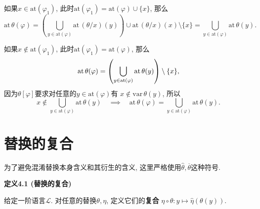 \begin{enumerate}
    \hspace{2.17em}
    如果$x\in\mathrm{at}(\varphi_1)$,
    此时$\mathrm{at}(\varphi_1)=\mathrm{at}(\varphi)\cup\{x\}$, 那么
    \vspace{3pt}
    \[
        \mathrm{at}\,\theta(\varphi)=
        \left(\bigcup_{y\in\mathrm{at}(\varphi)}\mathrm{at}\,(\theta/x)(y)\right)
        \cup\mathrm{at}\,(\theta/x)(x)\setminus\{x\}=
        \bigcup_{y\in\mathrm{at}(\varphi)}\mathrm{at}\,\theta(y).
    \]

    \hspace{2.17em}
    如果$x\notin\mathrm{at}(\varphi_1)$,
    此时$\mathrm{at}(\varphi_1)=\mathrm{at}(\varphi)$, 那么
    \[
        \mathrm{at}\,\theta(\varphi)=
        \left(\bigcup_{y\in\mathrm{at}(\varphi)}\mathrm{at}\,\theta(y)\right)
        \setminus\{x\},\\[3pt]
    \]
    因为$\theta[\varphi]$要求对任意的$y\in\mathrm{at}(\varphi)$有
    $x\notin\mathrm{var}\,\theta(y)$, 所以
    \begin{equation*}
        x\notin\bigcup_{y\in\mathrm{at}(\varphi)}\mathrm{at}\,\theta(y)\quad
        \implies\quad\mathrm{at}\,\theta(\varphi)=
        \bigcup_{y\in\mathrm{at}(\varphi)}\mathrm{at}\,\theta(y).
    \tag*{\qedsymbol}\end{equation*}
\end{enumerate}





\newpage



\section{替换的复合}

为了避免混淆替换本身含义和其衍生的含义,
这里严格使用$\widehat{\theta},\overline{\theta}$这种符号.

\vspace{10pt}

\hypertarget{sec:定义4.1}{}
\noindent\textbf{定义4.1 (替换的复合)}

给定一阶语言$\mathcal{L}$. 对任意的替换$\theta,\eta$, 定义它们的\textbf{复合}
$\eta\circ\theta:y\mapsto \widehat{\eta}(\theta(y))$.

\vspace{10pt}

